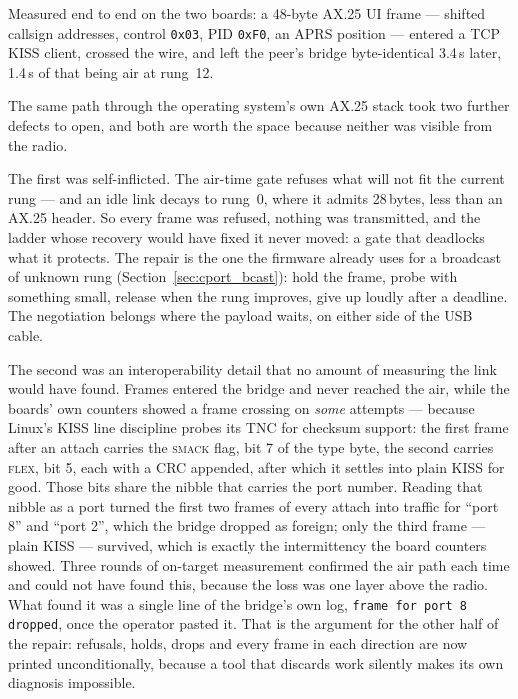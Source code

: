 Measured end to end on the two boards: a 48-byte AX.25 UI frame ---
shifted callsign addresses, control \texttt{0x03}, PID \texttt{0xF0},
an APRS position --- entered a TCP KISS client, crossed the wire, and
left the peer's bridge byte-identical 3.4\,s later, 1.4\,s of that
being air at rung~12.

The same path through the operating system's own AX.25 stack took two
further defects to open, and both are worth the space because neither
was visible from the radio.

The first was self-inflicted.  The air-time gate refuses what will not
fit the current rung --- and an idle link decays to rung~0, where it
admits 28\,bytes, less than an AX.25 header.  So every frame was
refused, nothing was transmitted, and the ladder whose recovery would
have fixed it never moved: a gate that deadlocks what it protects.  The
repair is the one the firmware already uses for a broadcast of unknown
rung (Section~\ref{sec:cport_bcast}): hold the frame, probe with
something small, release when the rung improves, give up loudly after a
deadline.  The negotiation belongs where the payload waits, on either
side of the USB cable.

The second was an interoperability detail that no amount of measuring
the link would have found.  Frames entered the bridge and never reached
the air, while the boards' own counters showed a frame crossing on
\emph{some} attempts --- because Linux's KISS line discipline probes
its TNC for checksum support: the first frame after an attach carries
the \textsc{smack} flag, bit 7 of the type byte, the second carries
\textsc{flex}, bit 5, each with a CRC appended, after which it settles
into plain KISS for good.  Those bits share the nibble that carries the
port number.  Reading that nibble as a port turned the first two frames
of every attach into traffic for ``port 8'' and ``port 2'', which the
bridge dropped as foreign; only the third frame --- plain KISS ---
survived, which is exactly the intermittency the board counters showed.
Three rounds of on-target measurement confirmed the air path each time
and could not have found this, because the loss was one layer above the
radio.  What found it was a single line of the bridge's own log,
\texttt{frame for port 8 dropped}, once the operator pasted it.  That
is the argument for the other half of the repair: refusals, holds,
drops and every frame in each direction are now printed
unconditionally, because a tool that discards work silently makes its
own diagnosis impossible.

